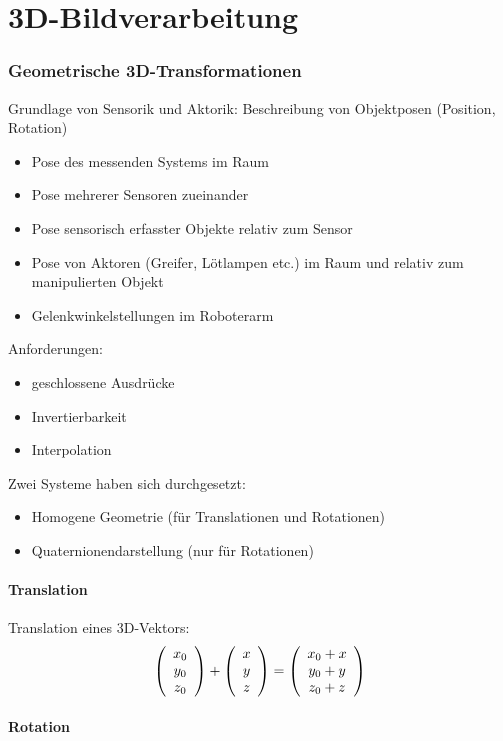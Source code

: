 
\chapter{3D-Bildverarbeitung}



\subsection{Geometrische 3D-Transformationen}

Grundlage von Sensorik und Aktorik: Beschreibung von Objektposen (Position, Rotation)
\begin{itemize}
\item Pose des messenden Systems im Raum
\item Pose mehrerer Sensoren zueinander
\item Pose sensorisch erfasster Objekte relativ zum Sensor
\item Pose von Aktoren (Greifer, Lötlampen etc.) im Raum und relativ zum manipulierten Objekt
\item Gelenkwinkelstellungen im Roboterarm
\end{itemize}
Anforderungen:
\begin{itemize}
\item geschlossene Ausdrücke
\item Invertierbarkeit
\item Interpolation
\end{itemize}
Zwei Systeme haben sich durchgesetzt:
\begin{itemize}
\item Homogene Geometrie (für Translationen und Rotationen)
\item Quaternionendarstellung (nur für Rotationen)
\end{itemize}

\subsubsection*{Translation}

Translation eines 3D-Vektors: $$\left( \begin{array}{c} x_0 \\ y_0 \\ z_0 \end{array} \right) + \left( \begin{array}{c} x \\ y \\ z \end{array} \right) = \left( \begin{array}{c} x_0 + x \\ y_0 + y \\ z_0 + z \end{array} \right)$$

\subsubsection*{Rotation}

